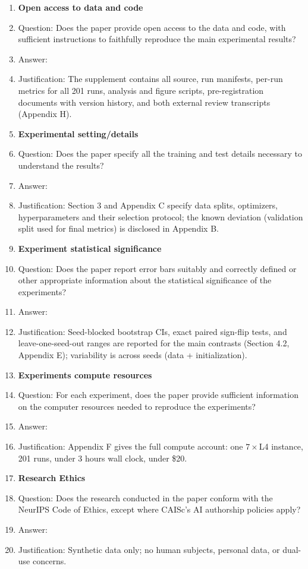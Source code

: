 \begin{enumerate}
\item {\bf Open access to data and code}
    \item[] Question: Does the paper provide open access to the data and code, with sufficient instructions to faithfully reproduce the main experimental results?
    \item[] Answer: \answerYes{}
    \item[] Justification: The supplement contains all source, run manifests, per-run metrics for all 201 runs, analysis and figure scripts, pre-registration documents with version history, and both external review transcripts (Appendix H).

\item {\bf Experimental setting/details}
    \item[] Question: Does the paper specify all the training and test details necessary to understand the results?
    \item[] Answer: \answerYes{}
    \item[] Justification: Section 3 and Appendix C specify data splits, optimizers, hyperparameters and their selection protocol; the known deviation (validation split used for final metrics) is disclosed in Appendix B.

\item {\bf Experiment statistical significance}
    \item[] Question: Does the paper report error bars suitably and correctly defined or other appropriate information about the statistical significance of the experiments?
    \item[] Answer: \answerYes{}
    \item[] Justification: Seed-blocked bootstrap CIs, exact paired sign-flip tests, and leave-one-seed-out ranges are reported for the main contrasts (Section 4.2, Appendix E); variability is across seeds (data + initialization).

\item {\bf Experiments compute resources}
    \item[] Question: For each experiment, does the paper provide sufficient information on the computer resources needed to reproduce the experiments?
    \item[] Answer: \answerYes{}
    \item[] Justification: Appendix F gives the full compute account: one $7\times$L4 instance, 201 runs, under 3 hours wall clock, under \$20.

\item {\bf Research Ethics}
    \item[] Question: Does the research conducted in the paper conform with the NeurIPS Code of Ethics, except where CAISc's AI authorship policies apply?
    \item[] Answer: \answerYes{}
    \item[] Justification: Synthetic data only; no human subjects, personal data, or dual-use concerns.


\end{enumerate}

